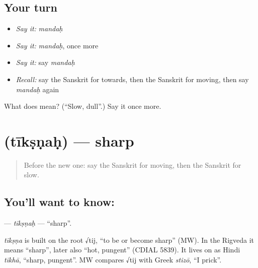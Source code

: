 \subsection*{Your turn}
\begin{itemize}
\raggedright
  \item \emph{Say it:} \emph{mandaḥ}
  \item \emph{Say it:} \emph{mandaḥ}, once more
  \item \emph{Say it:} say \emph{mandaḥ}
  \item \emph{Recall:} say the Sanskrit for towards, then the Sanskrit for moving, then say \emph{mandaḥ} again
\end{itemize}

\begin{tcolorbox}[breakable,colback=teal!4,colframe=teal!35!black,title={Before you move on}]
What does  mean? (\textquotedblleft{}Slow, dull\textquotedblright{}.) Say it once more.
\end{tcolorbox}
\section[\texorpdfstring{\sk{तीक्ष्णः} (tīkṣṇaḥ)}{तीक्ष्णः (tīkṣṇaḥ)}]{ (tīkṣṇaḥ) — sharp}

\label{lesson:SA-C215-tiksnah}



\begin{quote}
Before the new one: say the Sanskrit for moving, then the Sanskrit for slow.
\end{quote}

\subsection*{You'll want to know: }
\textbf{} — \emph{tīkṣṇaḥ} — \textquotedblleft{}sharp\textquotedblright{}.

\begin{cousinweb}
\emph{tīkṣṇa} is built on the root √tij, \textquotedblleft{}to be or become sharp\textquotedblright{} (MW). In the Rigveda it means \textquotedblleft{}sharp\textquotedblright{}, later also \textquotedblleft{}hot, pungent\textquotedblright{} (CDIAL 5839). It lives on as Hindi \emph{tīkhā}, \textquotedblleft{}sharp, pungent\textquotedblright{}. MW compares √tij with Greek \emph{stizō}, \textquotedblleft{}I prick\textquotedblright{}.
\end{cousinweb}

